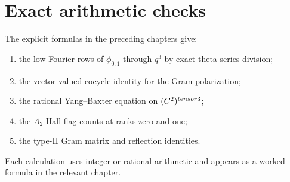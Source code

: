 \chapter{Exact arithmetic checks}
The explicit formulas in the preceding chapters give:
\begin{enumerate}
\item the low Fourier rows of $\phi_{0,1}$ through $q^3$ by exact theta-series division;
\item the vector-valued cocycle identity for the Gram polarization;
\item the rational Yang--Baxter equation on $(C^2)^{tensor3}$;
\item the $A_2$ Hall flag counts at ranks zero and one;
\item the type-II Gram matrix and reflection identities.
\end{enumerate}
Each calculation uses integer or rational arithmetic and appears as a worked formula in the relevant chapter.
